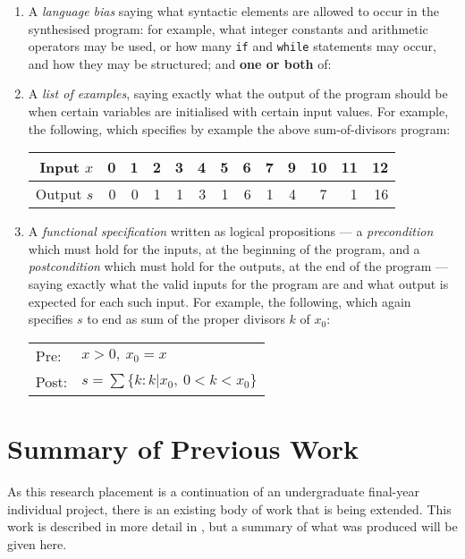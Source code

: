 \documentclass[a4paper,twoside,notitlepage,12pt]{article}
\begin{document}
\begin{enumerate}
    \item A \emph{language bias} saying what syntactic elements are allowed to occur in 
    the synthesised program: for example, what integer constants and arithmetic 
    operators may be used, or how many \verb|if| and \verb|while| statements may 
    occur, and how they may be structured; and \textbf{one or both} of:

    \item A \emph{list of examples}, saying exactly what the output of the program 
    should be when certain variables are initialised with certain input values. For 
    example, the following, which specifies by example the above 
    sum-of-divisors program:
    
    \begin{tabular}{| r || r | r | r | r | r | r | r | r | r | r | r | r |}
        \hline
        Input $x$  & 0 & 1 & 2 & 3 & 4 & 5 & 6 & 7 & 9 & 10 & 11 & 12 \\
        \hline
        Output $s$ & 0 & 0 & 1 & 1 & 3 & 1 & 6 & 1 & 4 &  7 &  1 & 16 \\
        \hline
    \end{tabular}

    \item A \emph{functional specification} written as logical propositions --- a 
    \emph{precondition} which must hold for the inputs, at the beginning of the 
    program, and a \emph{postcondition} which must hold for the outputs, at the end of 
    the program --- saying exactly what the valid inputs for the program are and 
    what output is expected for each such input. For example, the following, which 
    again specifies $s$ to end as sum of the proper divisors $k$ of $x_0$:
    
    \begin{tabular}{|ll|}
        \hline
        Pre:  & $x > 0,\ x_0 = x$ \\
        Post: & $s = \sum\{k : k|x_0,\ 0<k<x_0\}$ \\
        \hline
    \end{tabular}
    
\end{enumerate}

\section{Summary of Previous Work}

As this research placement is a continuation of an undergraduate final-year individual 
project, there is an existing body of work that is being extended. This work is 
described in more detail in \cite{final}, but a summary of what was produced will be 
given here.
\end{document}
